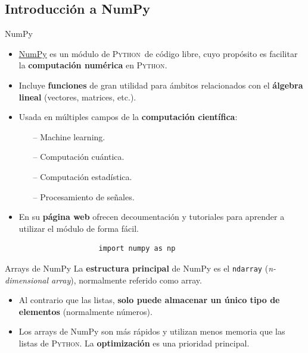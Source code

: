 \documentclass[10pt]{beamer} %
\newcommand{\py}{\textsc{Python}}
\begin{document}
\subsection{Introducción a NumPy}
\begin{frame}[fragile]{NumPy}
    \begin{itemize}
        \item \href{https://numpy.org/}{\underline{NumPy}} es un módulo de \py\, de código libre, cuyo propósito es facilitar la \textbf{computación numérica} en \py.
        \item Incluye \textbf{funciones} de gran utilidad para ámbitos relacionados con el \textbf{álgebra lineal} (vectores, matrices, etc.).
        \item Usada en múltiples campos de la \textbf{computación científica}:
        \begin{itemize}
            \item[--] Machine learning.
            \item[--] Computación cuántica.
            \item[--] Computación estadística.
            \item[--] Procesamiento de señales.
        \end{itemize}
        \item En su \textbf{página web} ofrecen decoumentación y tutoriales para aprender a utilizar el módulo de forma fácil.
    \end{itemize}
    \vspace{10pt}
    \begin{verbatim}
                      import numpy as np
    \end{verbatim}
\end{frame}

\begin{frame}{Arrays de NumPy}
    La \textbf{estructura principal} de NumPy es el \texttt{ndarray} (\textit{n-dimensional array}), normalmente referido como array.
    \begin{itemize}
        \item Al contrario que las listas, \textbf{solo puede almacenar un único tipo de elementos} (normalmente números).
        \item Los arrays de NumPy son más rápidos y utilizan menos memoria que las listas de \py. La \textbf{optimización} es una prioridad principal.
    \end{itemize}
\end{frame}
\end{document}
